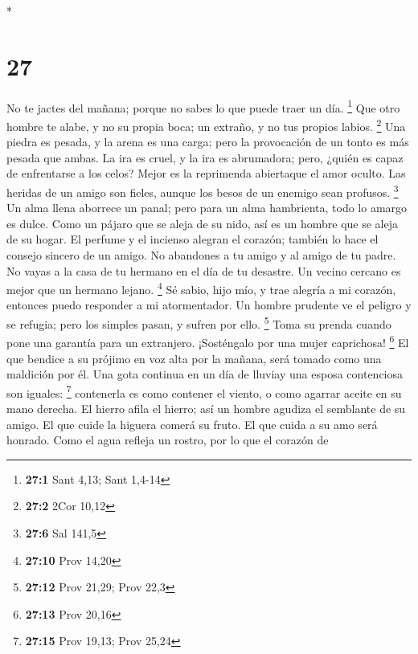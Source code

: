 \begin{paracol}{2}
\begin{otherlanguage}{english}
\end{otherlanguage}

\switchcolumn[0]*

\hypertarget{section-52}{%
\section{27}\label{section-52}}

 No te jactes del mañana; porque no sabes lo que puede
traer un día. \footnote{\textbf{27:1} Sant 4,13; Sant 1,4-14}
 Que otro hombre te alabe, y no su propia boca; un
extraño, y no tus propios labios. \footnote{\textbf{27:2} 2Cor 10,12}
 Una piedra es pesada, y la arena es una carga; pero la
provocación de un tonto es más pesada que ambas.  La ira
es cruel, y la ira es abrumadora; pero, ¿quién es capaz de enfrentarse a
los celos?  Mejor es la reprimenda abiertaque el amor
oculto.  Las heridas de un amigo son fieles, aunque los
besos de un enemigo sean profusos. \footnote{\textbf{27:6} Sal 141,5}
 Un alma llena aborrece un panal; pero para un alma
hambrienta, todo lo amargo es dulce.  Como un pájaro que
se aleja de su nido, así es un hombre que se aleja de su hogar.
 El perfume y el incienso alegran el corazón; también lo
hace el consejo sincero de un amigo.  No abandones a tu
amigo y al amigo de tu padre. No vayas a la casa de tu hermano en el día
de tu desastre. Un vecino cercano es mejor que un hermano lejano.
\footnote{\textbf{27:10} Prov 14,20}  Sé sabio, hijo mío,
y trae alegría a mi corazón, entonces puedo responder a mi atormentador.
 Un hombre prudente ve el peligro y se refugia; pero los
simples pasan, y sufren por ello. \footnote{\textbf{27:12} Prov 21,29;
  Prov 22,3}  Toma su prenda cuando pone una garantía
para un extranjero. ¡Sosténgalo por una mujer caprichosa! \footnote{\textbf{27:13}
  Prov 20,16}  El que bendice a su prójimo en voz alta
por la mañana, será tomado como una maldición por él. 
Una gota continua en un día de lluviay una esposa contenciosa son
iguales: \footnote{\textbf{27:15} Prov 19,13; Prov 25,24}
 contenerla es como contener el viento, o como agarrar
aceite en su mano derecha.  El hierro afila el hierro;
así un hombre agudiza el semblante de su amigo.  El que
cuide la higuera comerá su fruto. El que cuida a su amo será honrado.
 Como el agua refleja un rostro, por lo que el corazón de

\end{paracol}
